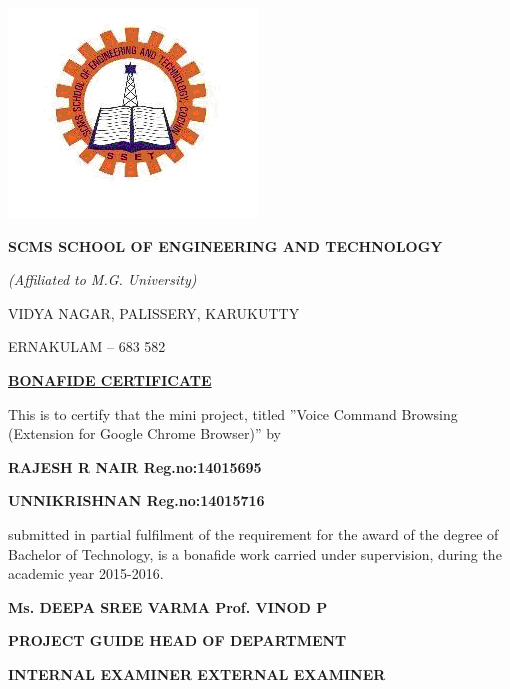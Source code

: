 \documentclass[12pt]{report} %
\begin{document}
	
	\thispagestyle{empty}
	\begin{center}
		\begin{minipage}{\linewidth}
			\centering
			\includegraphics[width=0.5\linewidth]{figures/logo.png}
			\vspace{1cm}
			\\
			
			{\Large \bf{SCMS SCHOOL OF ENGINEERING AND TECHNOLOGY}\par}
			{\Large \emph{(Affiliated to M.G. University)}\par}
			{\Large VIDYA NAGAR, PALISSERY, KARUKUTTY\par}
			{\Large ERNAKULAM – 683 582\par}
			\vspace{1cm}
			{\Large \bf{\underline{BONAFIDE CERTIFICATE}}\par}
			\vspace{0.5cm}
			\begin{flushleft}
				This is to certify that the mini project, titled ''Voice Command Browsing (Extension for Google Chrome  Browser)'' by
			\end{flushleft} 
			{ \bf{RAJESH R NAIR}\hspace{3cm}     Reg.no:14015695 \par}
			{ \bf{UNNIKRISHNAN}\hspace{3cm}      Reg.no:14015716 \par}
			\begin{flushleft}
				submitted in partial fulfilment of the requirement for the award of the degree of Bachelor of Technology, is a bonafide work carried under supervision, during the academic year 2015-2016.
			\end{flushleft}
		    \vspace{1cm}
			{ \bf{Ms. DEEPA SREE VARMA}\hspace{3.5cm}     Prof. VINOD P \par}
			{ \bf{PROJECT GUIDE}\hspace{3cm}      HEAD OF DEPARTMENT\par}
			
			\vspace{2cm}
			
			{ \bf{INTERNAL EXAMINER}\hspace{3cm}     EXTERNAL EXAMINER \par}
			
			
		\end{minipage}
	\end{center}
	\clearpage
	
\end{document}
